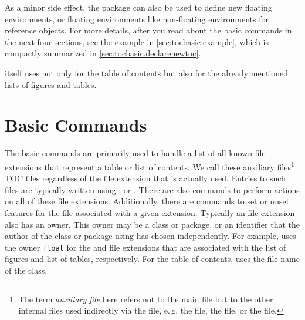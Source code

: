 As a minor side effect, the package can also be used to define new floating
environments, or floating environments like non-floating environments for
reference objects. For more details, after you read about the basic commands
in the next four sections, see the example in \autoref{sec:tocbasic.example},
which is compactly summarized in \autoref{sec:tocbasic.declarenewtoc}.

\KOMAScript{} itself uses  not only for the table of
contents but also for the already mentioned lists of figures and tables.

\section{Basic Commands}
\label{sec:tocbasic.basics}

The basic commands are primarily used to handle a list of all known file
extensions that
represent a table or list of contents. We call these auxiliary
files\footnote{The term \emph{auxiliary file} here
  refers not to the main  file but to the other internal files used
  indirectly via the  file, e.\,g. the  file, the
   file, or the  file.} TOC files regardless of the file extension that is
actually used. Entries to such files are typically written using
, or
. There are also commands to perform
actions on all of these file extensions. Additionally, there are commands to
set or unset features for the file associated with a given extension.
Typically an file extension also has an owner. This owner
may be a class or package, or an identifier that the author of the class or
package using  has chosen independently. For example,
\KOMAScript{} uses the owner \texttt{float} for the  and 
file extensions that are associated with the list of figures and list of
tables, respectively. For the table of contents, \KOMAScript{} uses the file
name of the class.


